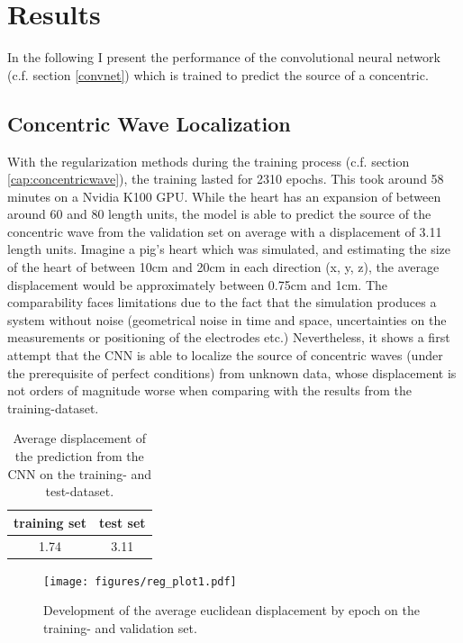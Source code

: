 \section{Results}
In the following I present the performance of the convolutional neural network (c.f. section \ref{convnet}) which is trained to predict the source of a concentric.
\subsection{Concentric Wave Localization} 
With the regularization methods during the training process (c.f. section \ref{cap:concentricwave}), the training lasted for 2310 epochs. This took around 58 minutes on a Nvidia K100 GPU. While the heart has an expansion of between around 60 and 80 length units, the model is able to predict the source of the concentric wave from the validation set on average with a displacement of 3.11 length units. Imagine a pig's heart which was simulated, and estimating the size of the heart of between 10cm and 20cm in each direction (x, y, z), the average displacement would be approximately between 0.75cm and 1cm. The comparability faces limitations due to the fact that the simulation produces a system without noise (geometrical noise in time and space, uncertainties on the measurements or positioning of the electrodes etc.) Nevertheless, it shows a first attempt that the CNN is able to localize the source of concentric waves (under the prerequisite of perfect conditions) from unknown data, whose displacement is not orders of magnitude worse when comparing with the results from the training-dataset.\\

\begin{table}[h]
    \centering
    \begin{tabular}{|c|c|}
    \hline
    training set & test set\\
    \hline
    1.74 & 3.11 \\
    \hline
    \end{tabular}
    \caption{Average displacement of the prediction from the CNN on the training- and test-dataset.}
    \label{tab:convarchitec}
\end{table}

\begin{figure}[ht]
    \center
    \texttt{[image: figures/reg\_plot1.pdf]}
	\caption{Development of the average euclidean displacement by epoch on the training- and validation set.}
	\fontsize{3}{2}
	\label{fig:autoencoder_architecture}
\end{figure}

